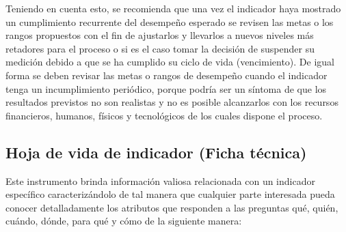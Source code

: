 \documentclass[
]{book}
\begin{document}
Teniendo en cuenta esto, se recomienda que una vez el indicador haya mostrado un cumplimiento recurrente del desempeño esperado se revisen las metas o los rangos propuestos con el fin de ajustarlos y llevarlos a nuevos niveles más retadores para el proceso o si es el caso tomar la decisión de suspender su medición debido a que se ha cumplido su ciclo de vida (vencimiento). De igual forma se deben revisar las metas o rangos de desempeño cuando el indicador tenga un incumplimiento periódico, porque podría ser un síntoma de que los resultados previstos no son realistas y no es posible alcanzarlos con los recursos financieros, humanos, físicos y tecnológicos de los cuales dispone el proceso.

\hypertarget{hoja-de-vida-de-indicador-ficha-tuxe9cnica}{%
\subsection{Hoja de vida de indicador (Ficha técnica)}\label{hoja-de-vida-de-indicador-ficha-tuxe9cnica}}

Este instrumento brinda información valiosa relacionada con un indicador específico caracterizándolo de tal manera que cualquier parte interesada pueda conocer detalladamente los atributos que responden a las preguntas qué, quién, cuándo, dónde, para qué y cómo de la siguiente manera:
\end{document}
